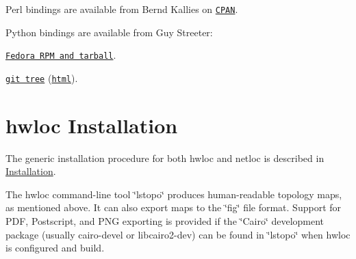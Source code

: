 Perl bindings are available from Bernd Kallies on \href{http://search.cpan.org/~bka/Sys-Hwloc-0.10/}{\tt C\+P\+AN}.

Python bindings are available from Guy Streeter\+: 
\begin{DoxyItemize}
\item \href{http://people.redhat.com/streeter/}{\tt Fedora R\+PM and tarball}. 
\item \href{git://git.fedorahosted.org/python-hwloc.git}{\tt git tree} (\href{http://git.fedorahosted.org/git/python-hwloc.git}{\tt html}). 
\end{DoxyItemize}

 \hypertarget{a00379_hwloc_installation}{}\section{hwloc Installation}\label{a00379_hwloc_installation}
The generic installation procedure for both hwloc and netloc is described in \hyperlink{index_common_installation}{Installation}.

The hwloc command-\/line tool \char`\"{}lstopo\char`\"{} produces human-\/readable topology maps, as mentioned above. It can also export maps to the \char`\"{}fig\char`\"{} file format. Support for P\+DF, Postscript, and P\+NG exporting is provided if the \char`\"{}\+Cairo\char`\"{} development package (usually {\ttfamily cairo-\/devel} or {\ttfamily libcairo2-\/dev}) can be found in \char`\"{}lstopo\char`\"{} when hwloc is configured and build.

